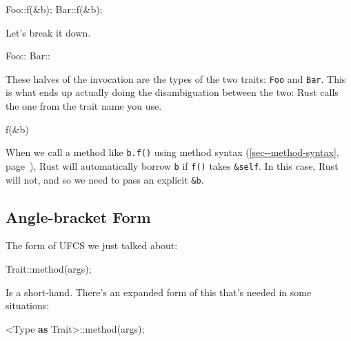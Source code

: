 \documentclass[a4paper,]{book}
\renewcommand*{\hyperref}[2][\ar]{%
  \def\ar{#2}%
  #2 (\autoref{#1}, page~\pageref{#1})}
\newenvironment{Shaded}{\begin{snugshade}}{\end{snugshade}}
\newcommand{\KeywordTok}[1]{\textcolor[rgb]{0.13,0.29,0.53}{\textbf{{#1}}}}
\newcommand{\NormalTok}[1]{{#1}}
\begin{document}
\begin{Shaded}
\begin{Highlighting}[]
\NormalTok{Foo::f(&b);}
\NormalTok{Bar::f(&b);}
\end{Highlighting}
\end{Shaded}

Let's break it down.

\begin{Shaded}
\begin{Highlighting}[]
\NormalTok{Foo::}
\NormalTok{Bar::}
\end{Highlighting}
\end{Shaded}

These halves of the invocation are the types of the two traits:
\texttt{Foo} and \texttt{Bar}. This is what ends up actually doing the
disambiguation between the two: Rust calls the one from the trait name
you use.

\begin{Shaded}
\begin{Highlighting}[]
\NormalTok{f(&b)}
\end{Highlighting}
\end{Shaded}

When we call a method like \texttt{b.f()} using
\hyperref[sec--method-syntax]{method syntax}, Rust will automatically
borrow \texttt{b} if \texttt{f()} takes \texttt{\&self}. In this case,
Rust will not, and so we need to pass an explicit \texttt{\&b}.

\subsection{Angle-bracket Form}\label{angle-bracket-form}

The form of UFCS we just talked about:

\begin{Shaded}
\begin{Highlighting}[]
\NormalTok{Trait::method(args);}
\end{Highlighting}
\end{Shaded}

Is a short-hand. There's an expanded form of this that's needed in some
situations:

\begin{Shaded}
\begin{Highlighting}[]
\NormalTok{<Type }\KeywordTok{as} \NormalTok{Trait>::method(args);}
\end{Highlighting}
\end{Shaded}
\end{document}
